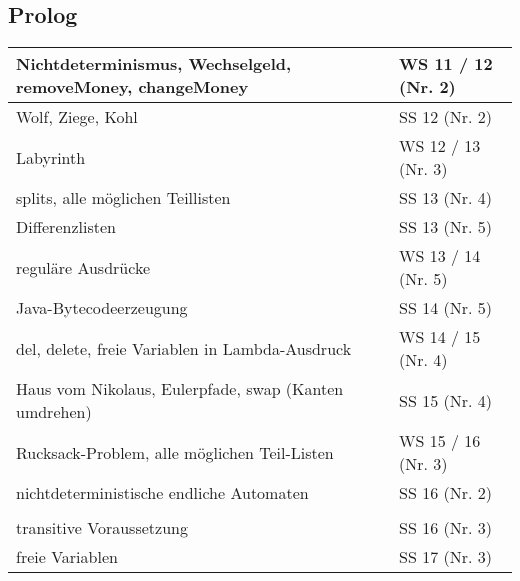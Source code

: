 \subsection*{Prolog}
\begin{table}[h]
	\centering
	\label{my-label}
	\begin{tabular}{l|l}
		Nichtdeterminismus, Wechselgeld, removeMoney, changeMoney
		& WS 11 / 12  (Nr. 2)\\ \hline
				
		Wolf, Ziege, Kohl
		& SS 12 (Nr. 2)\\ \hline
		
		Labyrinth
		& WS 12 / 13 (Nr. 3)\\ \hline
		
		splits, alle möglichen Teillisten
		& SS 13 (Nr. 4)\\ \hline
		
		Differenzlisten
		& SS 13 (Nr. 5)\\ \hline
		
		reguläre Ausdrücke
		& WS 13 / 14 (Nr. 5) \\ \hline
		
		Java-Bytecodeerzeugung
		& SS 14 (Nr. 5) \\ \hline
		
		del, delete, freie Variablen in Lambda-Ausdruck
		& WS 14 / 15 (Nr. 4) \\ \hline
		
		Haus vom Nikolaus, Eulerpfade, swap (Kanten umdrehen)
		& SS 15 (Nr. 4) \\ \hline
		
		Rucksack-Problem, alle möglichen Teil-Listen
		& WS 15 / 16 (Nr. 3) \\ \hline
		
		nichtdeterministische endliche Automaten
		& SS 16 (Nr. 2) \\ \hline
		
		\multlineTable{Noten-Datenbank, Campus-Verwaltungssystem,\\ transitive Voraussetzung}
		& SS 16 (Nr. 3) \\ \hline
		
		freie Variablen
		& SS 17 (Nr. 3) \\ \hline
	\end{tabular}
\end{table}
\FloatBarrier
\newpage

